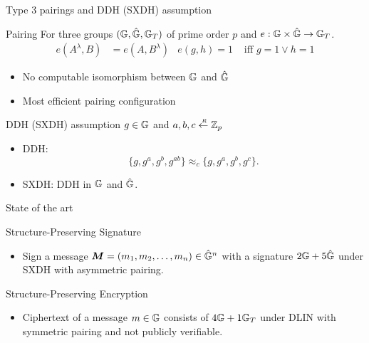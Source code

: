 \begin{frame}{Type 3 pairings and DDH (SXDH) assumption}
  \begin{block}{Pairing}
    For three groups $(\mathbb{G}, \hat{\mathbb{G}}, \mathbb{G}_T)$ of prime order $p$ and $e: \mathbb{G} \times \hat{\mathbb{G}} \to \mathbb{G}_T$.
    \begin{align*}
      e(A^{\lambda}, B) &= e(A, B^{\lambda}) & e(g,h) = 1 &\mbox{ iff } g=1 \vee h=1 
    \end{align*}
    \pause
    \begin{itemize}
    \item No computable isomorphism between $\mathbb{G}$ and $\hat{\mathbb{G}}$
      \pause
    \item Most efficient pairing configuration
    \end{itemize}
  \end{block}
  \pause
  \begin{block}{DDH (SXDH) assumption}
    $g \in \mathbb{G}$ and $a,b,c \stackrel{{\scriptscriptstyle \mkern4mu R}}{\gets} \mathbb{Z}_p$
 
    \begin{itemize}
    \item DDH:
      $$\{g,g^a, g^b, g^{ab}\} \approx_c \{g, g^a, g^b, g^c\}.$$
    \item SXDH: DDH in $\mathbb{G}$ and $\hat{\mathbb{G}}$.
    \end{itemize}
  \end{block}
 
\end{frame}


\begin{frame}{State of the art}
  
  \begin{block}{Structure-Preserving Signature}
    \begin{itemize}
    \item \cite{DBLP:journals/iacr/AbeHO10} Sign a message $\boldsymbol{M} = (m_1, m_2, \dots, m_n) \in \hat{\mathbb{G}}^n$ with a signature $2\mathbb{G} + 5\hat{\mathbb{G}}$ under SXDH with asymmetric pairing.
    \end{itemize}
  \end{block}

  \pause

  \begin{block}{Structure-Preserving Encryption}
    \begin{itemize}
    \item \cite{DBLP:conf/asiacrypt/CamenischHKLN11} Ciphertext of a message $m \in \mathbb{G}$ consists of $4\mathbb{G} + 1 \mathbb{G}_T$ under DLIN with symmetric pairing and not publicly verifiable.
    \end{itemize}
  \end{block}
    
\end{frame}
